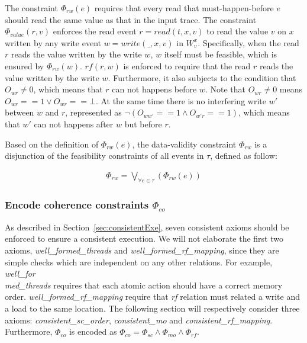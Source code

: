 \documentclass[preprint, numbers, 10pt]{sigplanconf}
\begin{document}
The constraint $\Phi_{rw}(e)$ requires that every read that must-happen-before 
$e$ should read the same value as that in the input trace. 
The constraint $\Phi_{value}(r,v)$ enforces the read event $r=read(t ,x,v)$ 
to read the value $v$ on $x$ written by any write event $w =write(\_,x,v)$ in $W^x_v$.
Specifically, when the read $r$ reads the value written by the write $w$,
$w$ itself must be feasible, which is ensured by $\Phi_{rw}(w)$. 
$rf(r,w)$ is enforced to require that the read $r$ reads the value written by the write $w$. 
Furthermore, it also subjects to the condition that $O_{wr}\neq 0$, which means that $r$ can
not happens before $w$. Note that $O_{wr}\neq 0$ means $O_{wr}==1 \vee O_{wr}==\bot$.  
At the same time there is no interfering write $w'$ between $w$ and $r$, represented as 
$\neg (O_{ww'}==1\wedge O_{w'r}==1)$, which means that 
$w'$ can not happens after $w$ but before $r$.

Based on the definition of $\Phi_{rw}(e)$, the data-validity constraint $\Phi_{rw}$
is a disjunction of the feasibility constraints of all events in $\tau$, defined as follow:

\begin{equation}
\begin{aligned}
\Phi_{rw} = \bigvee_{\forall e\in \tau} (\Phi_{rw}(e))
\end{aligned}
\end{equation} 

\subsubsection{Encode coherence constraints $\Phi_{co}$}

As described in Section~\ref{sec:consistentExe}, seven consistent axioms should be 
enforced to ensure a consistent execution. We will not elaborate the first two axioms, 
\textit{well\_formed\_threads} and \textit{well\_formed\_rf\_mapping}, since they
are simple checks which are independent on any other relations. For example, 
\textit{well\_for\\med\_threads} requires that each atomic action should have a correct
memory order. \textit{well\_formed\_rf\_mapping} require that \textit{rf} relation must related a write and 
a load to the same location. The following section will respectively consider three axioms:
\textit{consistent\_sc\_order}, \textit{consistent\_mo} and \textit{consistent\_rf\_mapping}.
Furthermore, $\Phi_{co}$ is encoded as $\Phi_{co}=\Phi_{sc}\wedge\Phi_{mo}\wedge\Phi_{rf}$. 
\end{document}
